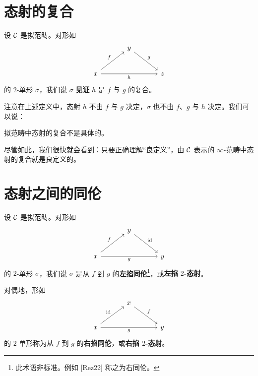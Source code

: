 \section{态射的复合}

\begin{definition}\label{L4-2.1}
设 $\mathcal{C}$ 是拟范畴。对形如
\[
\begin{tikzcd}[column sep=3.4em,row sep=2.4em]
& y \arrow[dr, "g"] & \\
x \arrow[ur, "f"] \arrow[rr, "h"'] & & z
\end{tikzcd}
\]
的 $2$-单形 $\sigma$，我们说 $\sigma$ \textbf{见证} $h$ 是 $f$ 与 $g$ 的复合。
\end{definition}

\begin{remark}\label{L4-2.2}
注意在上述定义中，态射 $h$ 不由 $f$ 与 $g$ 决定，$\sigma$ 也不由 $f$、$g$ 与 $h$ 决定。我们可以说：
\begin{center}
拟范畴中态射的复合不是具体的。
\end{center}
尽管如此，我们很快就会看到：只要正确理解“良定义”，由 $\mathcal{C}$ 表示的 $\infty$-范畴中态射的复合就是良定义的。
\end{remark}

\section{态射之间的同伦}

\begin{definition}\label{L4-3.1}
设 $\mathcal{C}$ 是拟范畴。对形如
\[
\begin{tikzcd}[column sep=3.4em,row sep=2.4em]
& y \arrow[dr, "\id"] & \\
x \arrow[ur, "f"] \arrow[rr, "g"'] & & y
\end{tikzcd}
\]
的 $2$-单形 $\sigma$，我们说 $\sigma$ 是从 $f$ 到 $g$ 的\textbf{左掐同伦}\footnote{此术语非标准。例如 [Rez22] 称之为右同伦。}，或\textbf{左掐 $2$-态射}。

对偶地，形如
\[
\begin{tikzcd}[column sep=3.4em,row sep=2.4em]
& x \arrow[dr, "f"] & \\
x \arrow[ur, "\id"] \arrow[rr, "g"'] & & y
\end{tikzcd}
\]
的 $2$-单形称为从 $f$ 到 $g$ 的\textbf{右掐同伦}，或\textbf{右掐 $2$-态射}。
\end{definition}


